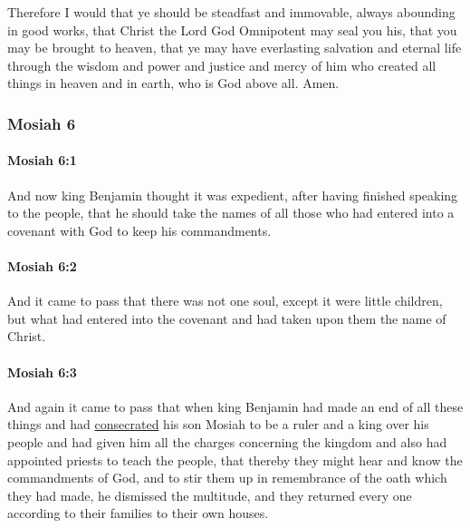 			Therefore I would that ye should be steadfast and immovable,
			always abounding in good works,
			that Christ the Lord God Omnipotent may seal you his,
			that you may be brought to heaven,
			that ye may have everlasting salvation and eternal life
			through the wisdom and power and justice and mercy of him
			who created all things in heaven and in earth,
			who is God above all.
			Amen.
			
	\subsubsection{Mosiah 6} %
		\label{MOSIAH-6}
		
		\paragraph{Mosiah 6:1} %
			\label{MOSIAH-6-1}

			And now king Benjamin thought it was expedient,
			after having finished speaking to the people,
			that he should take the names of all those
			who had entered into a covenant with God to keep his commandments.

		\paragraph{Mosiah 6:2} %
			\label{MOSIAH-6-2}

			And it came to pass that there was not one soul, except it were little children,
			but what had entered into the covenant
			and had taken upon them the name of Christ.

		\paragraph{Mosiah 6:3} %
			\label{MOSIAH-6-3}

			And again it came to pass that
			when king Benjamin had made an end of all these things
			and had \hyperref[CONSECRATION]{consecrated} his son Mosiah to be a ruler and a king over his people
			and had given him all the charges concerning the kingdom
			and also had appointed priests to teach the people,
			that thereby they might hear and know the commandments of God,
			and to stir them up in remembrance of the oath which they had made,
			he dismissed the multitude,
			and they returned every one according to their families to their own houses.

